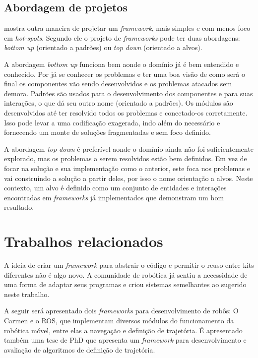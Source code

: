 \subsection{Abordagem de projetos}

\cite{Szyperski2002} mostra outra maneira de projetar um \textit{framework}, mais simples e com menos foco em \textit{hot-spots}. Segundo ele o projeto de \textit{frameworks} pode ter duas abordagens: \textit{bottom up} (orientado a padrões) ou \textit{top down} (orientado a alvos).

A abordagem \textit{bottom up} funciona bem aonde o domínio já é bem entendido e conhecido. Por já se conhecer os problemas e ter uma boa visão de como será o final os componentes vão sendo desenvolvidos e os problemas atacados sem demora. Padrões são usados para o desenvolvimento dos componentes e para suas interações, o que dá seu outro nome (orientado a padrões). Os módulos são desenvolvidos até ter resolvido todos os problemas e conectado-os corretamente. Isso pode levar a uma codificação exagerada, indo além do necessário e fornecendo um monte de soluções fragmentadas e sem foco definido.

A abordagem \textit{top down} é preferível aonde o domínio ainda não foi suficientemente explorado, mas os problemas a serem resolvidos estão bem definidos. Em vez de focar na solução e sua implementação como o anterior, este foca nos problemas e vai construindo a solução a partir deles, por isso o nome orientação a alvos. Neste contexto, um alvo é definido como um conjunto de entidades e interações encontradas em \textit{frameworks} já implementados que demonstram um bom resultado.

\section{Trabalhos relacionados}

A ideia de criar um \textit{framework} para abstrair o código e permitir o reuso entre kits diferentes não é algo novo. A comunidade de robótica já sentiu a necessidade de uma forma de adaptar seus programas e criou sistemas semelhantes ao sugerido neste trabalho.

A seguir será apresentado dois \textit{frameworks} para desenvolvimento de robôs: O Carmen e o ROS, que implementam diversos módulos do funcionamento da robótica móvel, entre elas a navegação e definição de trajetória. É apresentado também uma tese de PhD que apresenta um \textit{framework} para desenvolvimento e avaliação de algoritmos de definição de trajetória.

